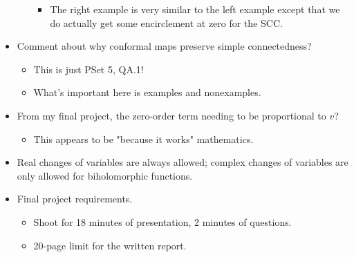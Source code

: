 \documentclass[../notes.tex]{subfiles}
\begin{document}
\begin{itemize}
\begin{itemize}
\begin{itemize}
            \item The right example is very similar to the left example except that we do actually get some encirclement at zero for the SCC.
        \end{itemize}
    \end{itemize}
    \item Comment about why conformal maps preserve simple connectedness?
    \begin{itemize}
        \item This is just PSet 5, QA.1!
        \item What's important here is examples and nonexamples.
    \end{itemize}
    \item From my final project, the zero-order term needing to be proportional to $v$?
    \begin{itemize}
        \item This appears to be "because it works" mathematics.
    \end{itemize}
    \item Real changes of variables are always allowed; complex changes of variables are only allowed for biholomorphic functions.
    \item Final project requirements.
    \begin{itemize}
        \item Shoot for 18 minutes of presentation, 2 minutes of questions.
        \item 20-page limit for the written report.
    \end{itemize}
\end{itemize}
\end{document}
